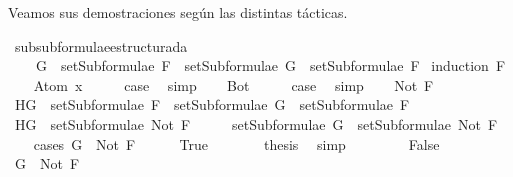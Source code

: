 \begin{isabellebody}
\begin{isamarkuptext}
Veamos sus demostraciones según las distintas tácticas.%
\end{isamarkuptext}\isamarkuptrue%
\isamarkupfalse%
\ subsubformulae{\isacharunderscore}estructurada{\isacharcolon}\ \isanewline
\ \ \ \ {\isachardoublequoteopen}G\ {\isasymin}\ setSubformulae\ F\ {\isasymLongrightarrow}\ setSubformulae\ G\ {\isasymsubseteq}\ setSubformulae\ F{\isachardoublequoteclose}\isanewline
%
\isadelimproof
%
\endisadelimproof
%
\isatagproof
{}\isamarkupfalse%
\ {\isacharparenleft}induction\ F{\isacharparenright}\isanewline
\ \ \isamarkupfalse%
\ {\isacharparenleft}Atom\ x{\isacharparenright}\isanewline
\ \ \isamarkupfalse%
\ \isamarkupfalse%
\ {\isacharquery}case\ \isamarkupfalse%
\ simp\isanewline
{}\isamarkupfalse%
\isanewline
\ \ \isamarkupfalse%
\ Bot\isanewline
\ \ \isamarkupfalse%
\ \isamarkupfalse%
\ {\isacharquery}case\ \isamarkupfalse%
\ simp\isanewline
{}\isamarkupfalse%
\isanewline
\ \ \isamarkupfalse%
\ {\isacharparenleft}Not\ F{\isacharparenright}\isanewline
\ \ \isamarkupfalse%
\ H{}{\isacharcolon}{\isachardoublequoteopen}G\ {\isasymin}\ setSubformulae\ F\ {\isasymLongrightarrow}\ setSubformulae\ G\ {\isasymsubseteq}\ setSubformulae\ F{\isachardoublequoteclose}\isanewline
\ \ \isamarkupfalse%
\ H{}{\isacharcolon}{\isachardoublequoteopen}G\ {\isasymin}\ setSubformulae\ {\isacharparenleft}Not\ F{\isacharparenright}{\isachardoublequoteclose}\isanewline
\ \ \isamarkupfalse%
\ \isamarkupfalse%
\ {\isachardoublequoteopen}setSubformulae\ G\ {\isasymsubseteq}\ setSubformulae\ {\isacharparenleft}Not\ F{\isacharparenright}{\isachardoublequoteclose}\isanewline
\ \ \isamarkupfalse%
\ {\isacharparenleft}cases\ {\isachardoublequoteopen}G\ {\isacharequal}\ Not\ F{\isachardoublequoteclose}{\isacharparenright}\isanewline
\ \ \ \ \isamarkupfalse%
\ True\isanewline
\ \ \ \ \isamarkupfalse%
\ \isamarkupfalse%
\ {\isacharquery}thesis\ \isamarkupfalse%
\ simp\isanewline
\ \ \isamarkupfalse%
\isanewline
\ \ \ \ \isamarkupfalse%
\ False\isanewline
\ \ \ \ \isamarkupfalse%
\ \isamarkupfalse%
\ {\isachardoublequoteopen}G\ {\isasymnoteq}\ Not\ F{\isachardoublequoteclose}\ \isamarkupfalse%

\end{isabellebody}
